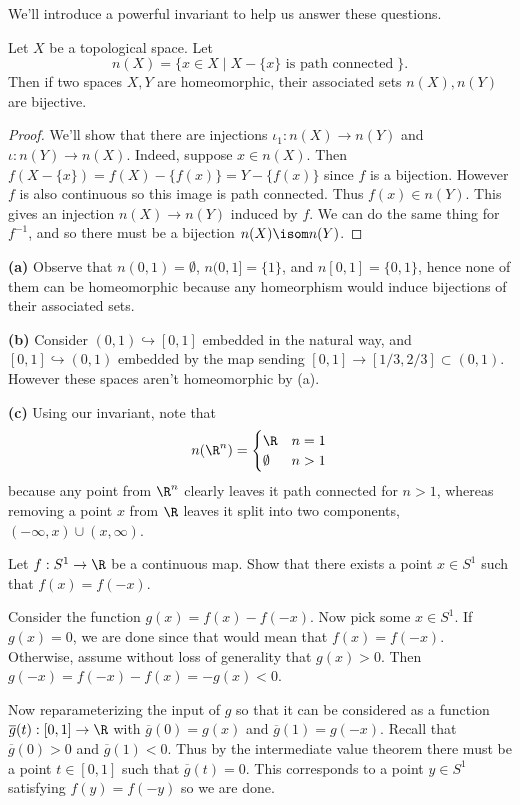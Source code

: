 \documentclass[11pt,letterpaper]{article}
\begin{document}
\begin{solution}
    We'll introduce a powerful invariant to help us answer these questions.
    \begin{claim}
        Let $X$ be a topological space. Let
        \[
            n(X)=\{ x\in X \mid X-\{x\}\textrm{ is path connected}\;\}
        .\]  
        Then if two spaces $X,Y$ are homeomorphic, their associated sets $n(X), n(Y)$ are bijective. 
    \end{claim}
    
    \begin{proof}
        We'll show that there are injections $\iota_1 : n(X) \to n(Y)$ and $\iota :  n(Y) \to n(X)$. Indeed, suppose $x\in n(X)$. Then $f(X-\{x\})=f(X)-\{f(x)\}= Y-\{f(x)\}$ since $f$ is a bijection. However $f$ is also continuous so this image is path connected. Thus $f(x)\in n(Y)$. This gives an injection $n(X)\to n(Y)$ induced by $f$. We can do the same thing for $f^{-1}$, and so there must be a bijection $n(X) \isom n(Y)$.
    \end{proof}

    \textbf{(a)} Observe that $n(0,1)=\emptyset$, $n(0,1]=\{1\}$, and $n[0,1]=\{0,1\}$, hence none of them can be homeomorphic because any homeorphism would induce bijections of their associated sets.
    
    \textbf{(b)} Consider $(0,1) \hookrightarrow [0,1]$ embedded in the natural way, and $[0,1] \hookrightarrow (0,1)$ embedded by the map sending $[0,1] \to [1 /3 ,2 /3]\subset (0,1)$. However these spaces aren't homeomorphic by (a).
    
    \textbf{(c)} Using our invariant, note that
    \[
        n(\R^n)=\begin{cases}
            \R & n=1\\
            \emptyset & n > 1
        \end{cases}
    \]  
    because any point from $\R^n$ clearly leaves it path connected for $n>1$, whereas removing a point $x$ from $\R$ leaves it split into two components, $(-\infty, x)\cup (x,\infty)$.
\end{solution}

\begin{problem}
    Let $f : S^1 \to \R$ be a continuous map. Show that there exists a point $x\in S^1$ such that $f(x)=f(-x)$.  
\end{problem}

\begin{solution}
    Consider the function $g(x)=f(x)-f(-x)$. Now pick some $x\in S^1$. If $g(x)=0$, we are done since that would mean that $f(x)=f(-x)$. Otherwise, assume without loss of generality that $g(x)>0$. Then $g(-x)=f(-x)-f(x)=-g(x)<0$. 
    
    Now reparameterizing the input of $g$ so that it can be considered as a function $\overline{g}(t) : [0,1] \to \R$ with $\overline{g}(0)=g(x)$ and $\overline{g}(1)=g(-x)$. Recall that $\overline{g}(0) > 0$ and $\overline{g}(1) < 0$. Thus by the intermediate value theorem there must be a point $t\in [0,1]$ such that $\overline{g}(t)=0$. This corresponds to a point $y\in S^1$ satisfying $f(y)=f(-y)$ so we are done.             
\end{solution}
\end{document}
